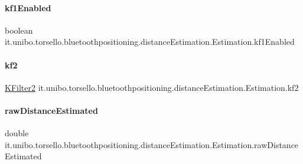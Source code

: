 \paragraph{\texorpdfstring{kf1\+Enabled}{kf1Enabled}}
{\footnotesize\ttfamily boolean it.\+unibo.\+torsello.\+bluetoothpositioning.\+distance\+Estimation.\+Estimation.\+kf1\+Enabled\hspace{0.3cm}{\ttfamily [private]}}

\hypertarget{classit_1_1unibo_1_1torsello_1_1bluetoothpositioning_1_1distanceEstimation_1_1Estimation_a1d085f6c0d1ac7db6c60fb20ae3a6475_a1d085f6c0d1ac7db6c60fb20ae3a6475}{}\label{classit_1_1unibo_1_1torsello_1_1bluetoothpositioning_1_1distanceEstimation_1_1Estimation_a1d085f6c0d1ac7db6c60fb20ae3a6475_a1d085f6c0d1ac7db6c60fb20ae3a6475} 
\paragraph{\texorpdfstring{kf2}{kf2}}
{\footnotesize\ttfamily \hyperlink{classit_1_1unibo_1_1torsello_1_1bluetoothpositioning_1_1filters_1_1kalmanFilter2_1_1KFilter2}{K\+Filter2} it.\+unibo.\+torsello.\+bluetoothpositioning.\+distance\+Estimation.\+Estimation.\+kf2\hspace{0.3cm}{\ttfamily [private]}}

\hypertarget{classit_1_1unibo_1_1torsello_1_1bluetoothpositioning_1_1distanceEstimation_1_1Estimation_a5afcd0b9b73a92b64669f060206f35db_a5afcd0b9b73a92b64669f060206f35db}{}\label{classit_1_1unibo_1_1torsello_1_1bluetoothpositioning_1_1distanceEstimation_1_1Estimation_a5afcd0b9b73a92b64669f060206f35db_a5afcd0b9b73a92b64669f060206f35db} 
\paragraph{\texorpdfstring{raw\+Distance\+Estimated}{rawDistanceEstimated}}
{\footnotesize\ttfamily double it.\+unibo.\+torsello.\+bluetoothpositioning.\+distance\+Estimation.\+Estimation.\+raw\+Distance\+Estimated\hspace{0.3cm}{\ttfamily [private]}}

